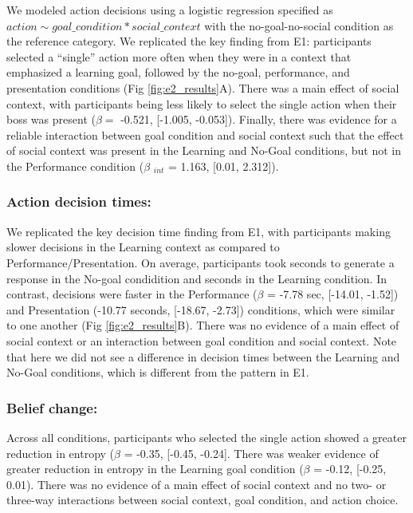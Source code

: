 \documentclass[10pt, letterpaper]{article}
\begin{document}
We modeled action decisions using a logistic regression specified as
\texttt{$action \sim goal\_condition * social\_context$} with the
no-goal-no-social condition as the reference category. We replicated the
key finding from E1: participants selected a ``single'' action more
often when they were in a context that emphasized a learning goal,
followed by the no-goal, performance, and presentation conditions (Fig
\ref{fig:e2_results}A). There was a main effect of social context, with
participants being less likely to select the single action when their
boss was present (\(\beta =\) -0.521, {[}-1.005, -0.053{]}). Finally,
there was evidence for a reliable interaction between goal condition and
social context such that the effect of social context was present in the
Learning and No-Goal conditions, but not in the Performance condition
(\(\beta\) \(_{int}\) = 1.163, {[}0.01, 2.312{]}).

\subsubsection{Action decision times:}\label{action-decision-times-1}

We replicated the key decision time finding from E1, with participants
making slower decisions in the Learning context as compared to
Performance/Presentation. On average, participants took seconds to
generate a response in the No-goal condidition and seconds in the
Learning condition. In contrast, decisions were faster in the
Performance (\(\beta\) = -7.78 sec, {[}-14.01, -1.52{]}) and
Presentation (-10.77 seconds, {[}-18.67, -2.73{]}) conditions, which
were similar to one another (Fig \ref{fig:e2_results}B). There was no
evidence of a main effect of social context or an interaction between
goal condition and social context. Note that here we did not see a
difference in decision times between the Learning and No-Goal
conditions, which is different from the pattern in E1.

\subsubsection{Belief change:}\label{belief-change-1}

Across all conditions, participants who selected the single action
showed a greater reduction in entropy (\(\beta\) = -0.35, {[}-0.45,
-0.24{]}. There was weaker evidence of greater reduction in entropy in
the Learning goal condition (\(\beta\) = -0.12, {[}-0.25, 0.01). There
was no evidence of a main effect of social context and no two- or
three-way interactions between social context, goal condition, and
action choice.
\end{document}
